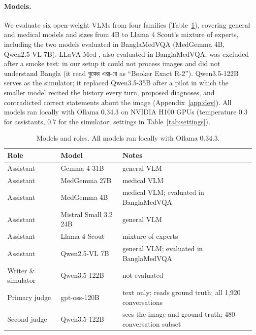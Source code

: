 \documentclass[11pt]{article}
\newcommand{\bn}[1]{{\bnfont #1}}
\newcommand{\gpt}{gpt-oss-120B}
\newcommand{\qw}{Qwen3.5-122B}
\begin{document}
\paragraph{Models.} We evaluate six open-weight VLMs from four families (Table~\ref{tab:models}), covering general and medical models and sizes from 4B to Llama 4 Scout's mixture of experts, including the two models evaluated in BanglaMedVQA (MedGemma 4B, Qwen2.5-VL 7B). LLaVA-Med \citep{li2023llavamed}, also evaluated in BanglaMedVQA, was excluded after a smoke test: in our setup it could not process images and did not understand Bangla (it read \bn{বুকের এক্স}-\bn{রে} as ``Booker Exact R-2''). Qwen3.5-122B serves as the simulator; it replaced Qwen3.5-35B after a pilot in which the smaller model recited the history every turn, proposed diagnoses, and contradicted correct statements about the image (Appendix~\ref{app:dev}). All models ran locally with Ollama \citep{ollama} 0.34.3 on NVIDIA H100 GPUs (temperature 0.3 for assistants, 0.7 for the simulator; settings in Table~\ref{tab:settings}).

\begin{table}[t]
\centering\small
\begin{tabular}{llp{4.1cm}}
\toprule
Role & Model & Notes \\
\midrule
Assistant & Gemma 4 31B \citep{gemma4} & general VLM \\
Assistant & MedGemma 27B \citep{sellergren2025medgemma} & medical VLM \\
Assistant & MedGemma 4B \citep{sellergren2025medgemma} & medical VLM; evaluated in BanglaMedVQA \\
Assistant & Mistral Small 3.2 24B \citep{mistral2025small32} & general VLM \\
Assistant & Llama 4 Scout \citep{meta2025llama4} & mixture of experts \\
Assistant & Qwen2.5-VL 7B \citep{bai2025qwen25vl} & general VLM; evaluated in BanglaMedVQA \\
\midrule
Writer \& simulator & \qw{} \citep{qwen35} & not evaluated \\
Primary judge & \gpt{} \citep{openai2025gptoss} & text only; reads ground truth; all 1,920 conversations \\
Second judge & \qw{} & sees the image and ground truth; 480-conversation subset \\
\bottomrule
\end{tabular}
\caption{Models and roles. All models ran locally with Ollama 0.34.3.}
\label{tab:models}
\end{table}
\end{document}
